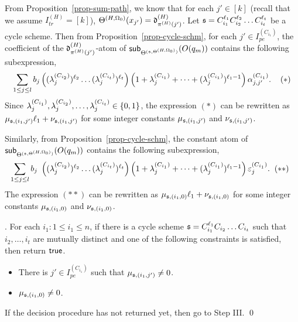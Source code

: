 \medskip


From Proposition~\ref{prop-sum-path}, we know that for each $j' \in [k]$ (recall that we assume $I^{(H)}_{tr}=[k]$), $\sumf^{(H,\initval_0)}(x_{j'})=\vard^{(H)}_{\pi^{(H)}(j')}$.  Let $\schm=C_{i_1}^{\ell_1} C_{i_2}^{\ell_2} \dots C_{i_t}^{\ell_t}$ be a cycle scheme. Then from Proposition~\ref{prop-cycle-schm}, for each $j' \in  I^{(C_{i_1})}_{pe}$, the coefficient of the $\vard^{(H)}_{\pi^{(H)}(j')}$-atom of $\sub{O(q_m)}{\sumf^{(\schm,\sumf^{(H,\initval_0)})}}$ contains the following subexpression, 
\[
\sum \limits_{1 \le j \le l} 
b_j \left((\cstl^{(C_{i_2})}_{j})^{\ell_2} \dots (\cstl^{(C_{i_t})}_{j})^{\ell_t}\right) 
\left(1+\cstl^{(C_{i_1})}_{j} + \dots + (\cstl^{(C_{i_1})}_{j})^{\ell_1-1} \right) \csta^{(C_{i_1})}_{j,j'}.
\hspace{4mm} (\ast)
\]
Since $\cstl^{(C_{i_1})}_{j}, \cstl^{(C_{i_2})}_{j}, \dots, \cstl^{(C_{i_t})}_{j} \in \{0, 1\}$, the expression $(\ast)$  can be rewritten as  
 $\mu_{\schm, (i_1,j')} \ell_1 + \nu_{\schm, (i_1,j')}$ for some integer constants $\mu_{\schm, (i_1,j')}$ and $\nu_{\schm, (i_1,j')}$. 
 
Similarly, from Proposition~\ref{prop-cycle-schm},  the constant atom of  $\sub{O(q_m)}{\sumf^{(\schm,\sumf^{(H,\initval_0)})}}$ contains the following  subexpression,
\[
\sum \limits_{1 \le j \le l} b_j
\begin{array}{l}
 \left((\lambda^{(C_{i_2})}_{j})^{\ell_2} \dots (\lambda^{(C_{i_t})}_{j})^{\ell_t}\right)
\left(1+\lambda^{(C_{i_1})}_{j} + \dots + (\lambda^{(C_{i_1})}_{j})^{\ell_1-1} \right) \cste^{(C_{i_1})}_{j}. \hspace{2mm} (\ast\ast)
\end{array}
\]
%
The expression $(\ast\ast)$ can be rewritten as $\mu_{\schm,(i_1,0)} \ell_1 + \nu_{\schm,(i_1,0)}$ for some integer constants $\mu_{\schm, (i_1,0)}$ and $\nu_{\schm, (i_1,0)}$.


 
 \smallskip

. For each $i_1: 1 \le i_1 \le n$, if there is a cycle scheme $\schm=C_{i_1}^{\ell_1} C_{i_2} \dots C_{i_t}$ such that $i_2,\dots,i_t$ are mutually distinct and 
one of the following constraints is satisfied, then return $\ltrue$.
\begin{itemize}
\item There is $j' \in  I^{(C_{i_1})}_{pe}$ such that $\mu_{\schm,(i_1,j')} \neq 0$.
%
\item $\mu_{\schm,(i_1,0)} \neq 0$.
%
\end{itemize}
%
If the decision procedure has not returned yet, then go to Step III. \qed

